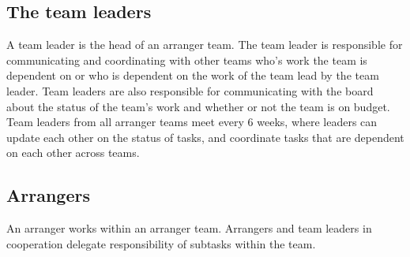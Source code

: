 \subsection{The team leaders}
\label{sub:team_leaders}
A team leader is the head of an arranger team. The team leader is responsible for communicating and coordinating with other teams who's work the team is dependent on or who is dependent on the work of the team lead by the team leader. Team leaders are also responsible for communicating with the board about the status of the team's work and whether or not the team is on budget. Team leaders from all arranger teams meet every 6 weeks, where leaders can update each other on the status of tasks, and coordinate tasks that are dependent on each other across teams.

\subsection{Arrangers}
\label{sub:team_members}
An arranger works within an arranger team. Arrangers and team leaders in cooperation delegate responsibility of subtasks within the team.


